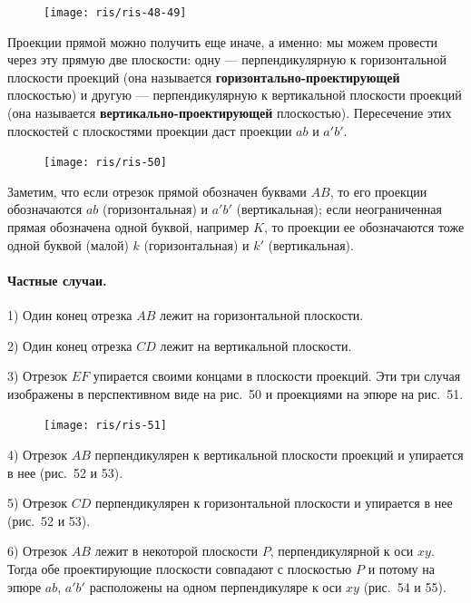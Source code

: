 \documentclass[twoside]{book}
\begin{document}
\begin{figure}[h!]
\centering
\texttt{[image: ris/ris-48-49]}
\caption{}
\end{figure}

{\sloppy 
Проекции прямой можно получить еще иначе, а именно: мы можем провести через эту прямую две плоскости: одну --- перпендикулярную к горизонтальной плоскости проекций (она называется \textbf{горизонтально-проектирующей} плоскостью) и другую --- перпендикулярную к вертикальной плоскости проекций (она называется \textbf{вертикально-проектирующей} плоскостью).
Пересечение этих плоскостей с плоскостями проекции даст проекции $ab$ и $a'b'$.

}

\begin{figure}[h!]
\centering
\texttt{[image: ris/ris-50]}
\caption{}
\end{figure}

Заметим, что если отрезок прямой обозначен буквами $AB$, то его проекции обозначаются $ab$ (горизонтальная) и $a'b'$ (вертикальная);
если неограниченная прямая обозначена одной буквой, например $K$, то проекции ее обозначаются тоже одной буквой (малой) $k$ (горизонтальная) и $k'$ (вертикальная).

\paragraph{Частные случаи.}\label{1938/s57}
1) Один конец отрезка $AB$ лежит на горизонтальной плоскости.

2) Один конец отрезка $CD$ лежит на вертикальной плоскости.

3) Отрезок $EF$ упирается своими концами в плоскости проекций.
Эти три случая изображены в перспективном виде на рис.~50 и проекциями на эпюре на рис.~51.

\begin{figure}[h!]
\centering
\texttt{[image: ris/ris-51]}
\caption{}
\end{figure}

4) Отрезок $AB$ перпендикулярен к вертикальной плоскости проекций и упирается в нее (рис.~52 и 53).

5) Отрезок $CD$ перпендикулярен к горизонтальной плоскости и упирается в нее (рис.~52 и 53).

6) Отрезок $AB$ лежит в некоторой плоскости $P$, перпендикулярной к оси $xy$.
Тогда обе проектирующие плоскости совпадают с плоскостью $P$ и потому на эпюре $ab$, $a'b'$ расположены на одном перпендикуляре к оси $xy$ (рис.~54 и 55).
\end{document}
